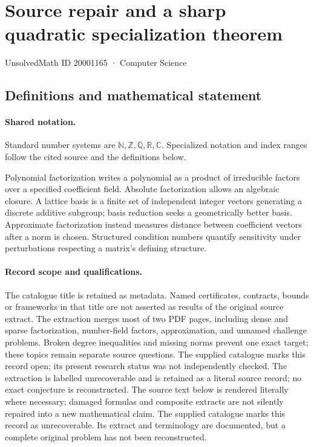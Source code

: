 \documentclass[11pt]{article}
\begin{document}
\setcounter{section}{20001164}
\section{Source repair and a sharp quadratic specialization theorem}\label{20001165}
{\small\sffamily UnsolvedMath ID 20001165 · Computer Science}
\subsection{Definitions and mathematical statement}

\paragraph{Shared notation.}Standard number systems are $\mathbb N,\mathbb Z,\mathbb Q,\mathbb R,\mathbb C$. Specialized notation and index ranges follow the cited source and the definitions below.


Polynomial factorization writes a polynomial as a product of irreducible factors over a specified coefficient field. Absolute factorization allows an algebraic closure. A lattice basis is a finite set of independent integer vectors generating a discrete additive subgroup; basis reduction seeks a geometrically better basis. Approximate factorization instead measures distance between coefficient vectors after a norm is chosen. Structured condition numbers quantify sensitivity under perturbations respecting a matrix's defining structure.
\paragraph{Record scope and qualifications.}
The catalogue title is retained as metadata. Named certificates, contracts, bounds or frameworks in that title are not asserted as results of the original source extract.
The extraction merges most of two PDF pages, including dense and sparse factorization, number-field factors, approximation, and unnamed challenge problems. Broken degree inequalities and missing norms prevent one exact target; these topics remain separate source questions. The supplied catalogue marks this record open; its present research status was not independently checked. The extraction is labelled unrecoverable and is retained as a literal source record; no exact conjecture is reconstructed.
The source text below is rendered literally where necessary; damaged formulas and composite extracts are not silently repaired into a new mathematical claim.
The supplied catalogue marks this record as unrecoverable. Its extract and terminology are documented, but a complete original problem has not been reconstructed.
\end{document}
